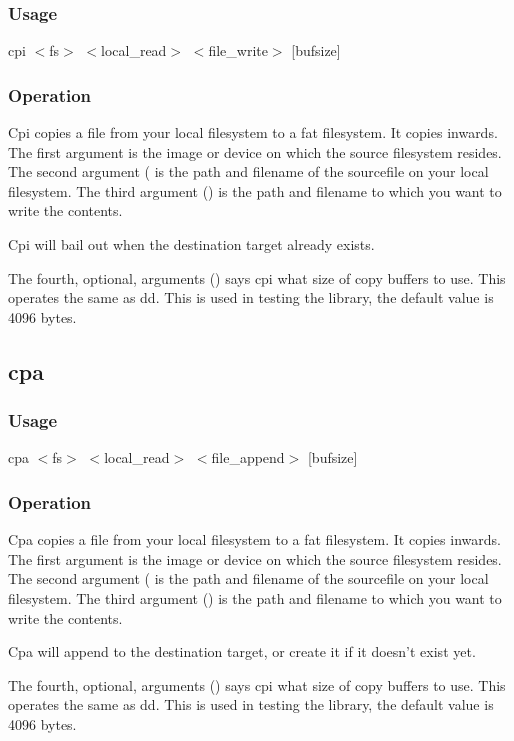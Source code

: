     \subsubsection*{Usage}
	cpi $<$fs$>$ $<$local\_read$>$ $<$file\_write$>$ [bufsize]
    \subsubsection*{Operation}
	Cpi copies a file from your local filesystem to a fat filesystem. It copies inwards.
        The first argument  is the image or device on which the source
        filesystem resides. The second argument ( is the path and filename
        of the sourcefile on your local filesystem. The third argument () is the
        path and filename to which you want to write the contents.

        Cpi will bail out when the destination target already exists.

        The fourth, optional, arguments () says cpi what size of copy buffers
        to use. This operates the same as dd. This is used in testing the library, the
        default value is 4096 bytes.                                                
	
\subsection{cpa}
    \subsubsection*{Usage}
	cpa $<$fs$>$ $<$local\_read$>$ $<$file\_append$>$ [bufsize]
    \subsubsection*{Operation}
	Cpa copies a file from your local filesystem to a fat filesystem. It copies inwards.
        The first argument  is the image or device on which the source
        filesystem resides. The second argument ( is the path and filename
        of the sourcefile on your local filesystem. The third argument () is the
        path and filename to which you want to write the contents.

        Cpa will append to the destination target, or create it if it doesn't exist yet.

        The fourth, optional, arguments () says cpi what size of copy buffers
        to use. This operates the same as dd. This is used in testing the library, the
        default value is 4096 bytes.                                                
    

